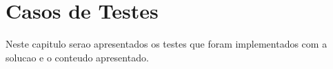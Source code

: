 \newpage
\chapter{Casos de Testes}
Neste capitulo serao apresentados os testes que foram implementados com a solucao e o conteudo apresentado.